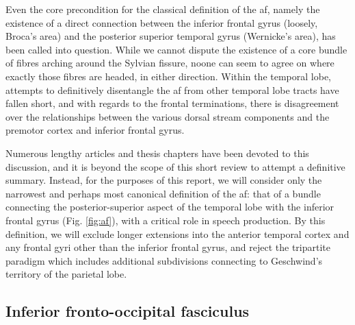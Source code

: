Even the core precondition for the classical definition of the \gls{af}, namely the existence of a direct connection between the inferior frontal gyrus (loosely, Broca's area) and the posterior superior temporal gyrus (Wernicke's area), has been called into question.\autocite{Dick2012,Giampiccolo2022a}
While we cannot dispute the existence of a core bundle of fibres arching around the Sylvian fissure, noone can seem to agree on where exactly those fibres are headed, in either direction.
Within the temporal lobe, attempts to definitively disentangle the \gls{af} from other temporal lobe tracts have fallen short,\autocite{Becker2022} and with regards to the frontal terminations, there is disagreement over the relationships between the various dorsal stream components and the premotor cortex and inferior frontal gyrus.\autocite{Kljajevic2014a,Giampiccolo2022a}

Numerous lengthy articles and thesis chapters have been devoted to this discussion, and it is beyond the scope of this short review to attempt a definitive summary.
Instead, for the purposes of this report, we will consider only the narrowest and perhaps most canonical definition of the \gls{af}: that of a bundle connecting the posterior-superior aspect of the temporal lobe with the inferior frontal gyrus (Fig. \ref{fig:af}), with a critical role in speech production.\autocite{Baldo2015}
By this definition, we will exclude longer extensions into the anterior temporal cortex\autocite{Giampiccolo2022a} and any frontal gyri other than the inferior frontal gyrus, and reject the tripartite paradigm which includes additional subdivisions connecting to Geschwind's territory of the parietal lobe.\autocite{Catani2005,Martino2013a}

\subsection{Inferior fronto-occipital fasciculus}


